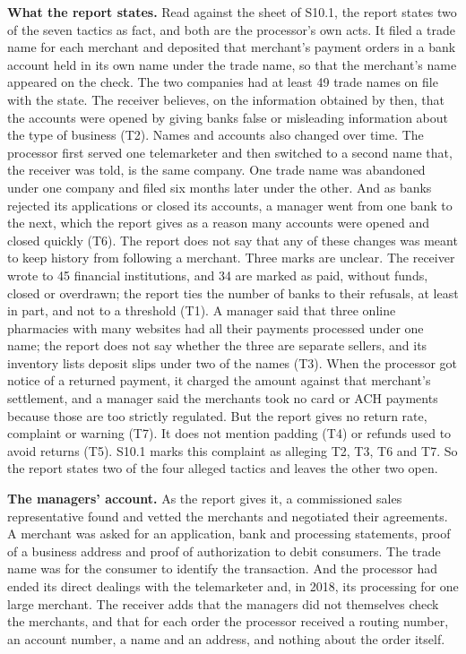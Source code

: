 \documentclass[
  11pt,
]{article}
\begin{document}
\textbf{What the report states.} Read against the sheet of S10.1, the
report states two of the seven tactics as fact, and both are the
processor's own acts. It filed a trade name for each merchant and
deposited that merchant's payment orders in a bank account held in its
own name under the trade name, so that the merchant's name appeared on
the check. The two companies had at least 49 trade names on file with
the state. The receiver believes, on the information obtained by then,
that the accounts were opened by giving banks false or misleading
information about the type of business (T2). Names and accounts also
changed over time. The processor first served one telemarketer and then
switched to a second name that, the receiver was told, is the same
company. One trade name was abandoned under one company and filed six
months later under the other. And as banks rejected its applications or
closed its accounts, a manager went from one bank to the next, which the
report gives as a reason many accounts were opened and closed quickly
(T6). The report does not say that any of these changes was meant to
keep history from following a merchant. Three marks are unclear. The
receiver wrote to 45 financial institutions, and 34 are marked as paid,
without funds, closed or overdrawn; the report ties the number of banks
to their refusals, at least in part, and not to a threshold (T1). A
manager said that three online pharmacies with many websites had all
their payments processed under one name; the report does not say whether
the three are separate sellers, and its inventory lists deposit slips
under two of the names (T3). When the processor got notice of a returned
payment, it charged the amount against that merchant's settlement, and a
manager said the merchants took no card or ACH payments because those
are too strictly regulated. But the report gives no return rate,
complaint or warning (T7). It does not mention padding (T4) or refunds
used to avoid returns (T5). S10.1 marks this complaint as alleging T2,
T3, T6 and T7. So the report states two of the four alleged tactics and
leaves the other two open.

\textbf{The managers' account.} As the report gives it, a commissioned
sales representative found and vetted the merchants and negotiated their
agreements. A merchant was asked for an application, bank and processing
statements, proof of a business address and proof of authorization to
debit consumers. The trade name was for the consumer to identify the
transaction. And the processor had ended its direct dealings with the
telemarketer and, in 2018, its processing for one large merchant. The
receiver adds that the managers did not themselves check the merchants,
and that for each order the processor received a routing number, an
account number, a name and an address, and nothing about the order
itself.
\end{document}
